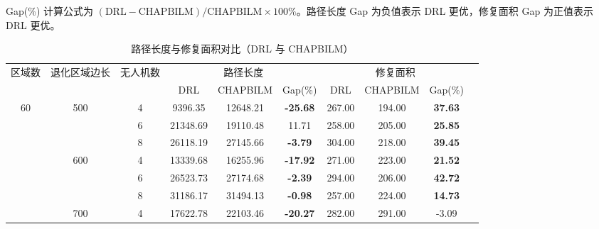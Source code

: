 \documentclass[AutoFakeBold]{LZUThesis}
\begin{document}
Gap(\%) 计算公式为 $(\text{DRL} - \text{CHAPBILM}) / \text{CHAPBILM} \times 100\%$。路径长度 Gap 为负值表示 DRL 更优，修复面积 Gap 为正值表示 DRL 更优。
\begin{table}[H]
	\centering
	\caption{路径长度与修复面积对比（DRL 与 CHAPBILM）}
	\small
	\setlength{\tabcolsep}{3.5pt}
	\begin{tabular}{ccc cccc ccc}
		\toprule
		\multirow{2}{*}{区域数} & \multirow{2}{*}{退化区域边长} & \multirow{2}{*}{ 无人机数} & \multicolumn{3}{c}{路径长度} & \multicolumn{3}{c}{修复面积}                                                              \\
		\cmidrule(lr){4-6}\cmidrule(lr){7-9}
		                     &                         &                        & DRL                      & CHAPBILM                 & Gap(\%)         & DRL    & CHAPBILM       & Gap(\%)        \\
		\midrule
		\multirow{9}{*}{60}
		                     & \multirow{3}{*}{500}
		                     & 4                       & 9396.35                & 12648.21                 & \textbf{-25.68}          & 267.00          & 194.00 & \textbf{37.63}                  \\
		                     &                         & 6                      & 21348.69                 & 19110.48                 & 11.71           & 258.00 & 205.00         & \textbf{25.85} \\
		                     &                         & 8                      & 26118.19                 & 27145.66                 & \textbf{-3.79}  & 304.00 & 218.00         & \textbf{39.45} \\
		\cmidrule(lr){2-9}
		                     & \multirow{3}{*}{600}
		                     & 4                       & 13339.68               & 16255.96                 & \textbf{-17.92}          & 271.00          & 223.00 & \textbf{21.52}                  \\
		                     &                         & 6                      & 26523.73                 & 27174.68                 & \textbf{-2.39}  & 294.00 & 206.00         & \textbf{42.72} \\
		                     &                         & 8                      & 31186.17                 & 31494.13                 & \textbf{-0.98}  & 257.00 & 224.00         & \textbf{14.73} \\
		\cmidrule(lr){2-9}
		                     & \multirow{3}{*}{700}
		                     & 4                       & 17622.78               & 22103.46                 & \textbf{-20.27}          & 282.00          & 291.00 & -3.09                           \\

\end{tabular}
\end{table}
\end{document}
